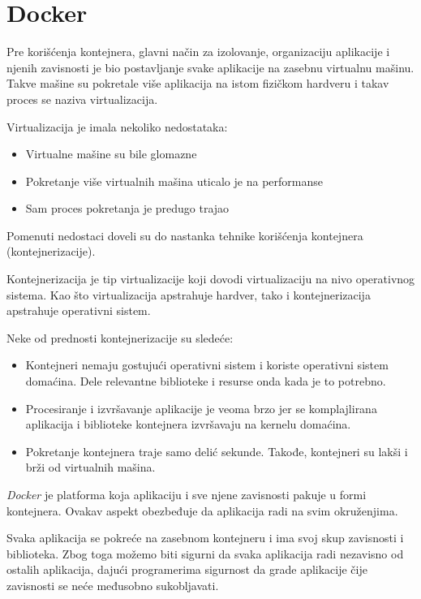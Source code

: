 \section{Docker}\label{sec:docker}

Pre korišćenja kontejnera, glavni način za izolovanje, organizaciju aplikacije i njenih zavisnosti je 
bio postavljanje svake aplikacije na zasebnu virtualnu mašinu. Takve mašine su pokretale više aplikacija 
na istom fizičkom hardveru i takav proces se naziva virtualizacija.

Virtualizacija je imala nekoliko nedostataka: 
\begin{itemize}
    \item Virtualne mašine su bile glomazne
    \item Pokretanje više virtualnih mašina uticalo je na performanse
    \item Sam proces pokretanja je predugo trajao
\end{itemize}

Pomenuti nedostaci doveli su do nastanka tehnike korišćenja kontejnera (kontejnerizacije). 

Kontejnerizacija je tip virtualizacije koji dovodi virtualizaciju na nivo operativnog 
sistema. Kao što virtualizacija apstrahuje hardver, tako i kontejnerizacija apstrahuje 
operativni sistem.

Neke od prednosti kontejnerizacije su sledeće:
\begin{itemize}
    \item Kontejneri nemaju gostujući operativni sistem i koriste operativni sistem domaćina. 
    Dele relevantne biblioteke i resurse onda kada je to potrebno.
    \item Procesiranje i izvršavanje aplikacije je veoma brzo jer se komplajlirana aplikacija 
    i biblioteke kontejnera izvršavaju na kernelu domaćina.
    \item Pokretanje kontejnera traje samo delić sekunde. Takođe, kontejneri su lakši i brži 
    od virtualnih mašina.
\end{itemize}

\textit{Docker} je platforma koja aplikaciju i sve njene zavisnosti pakuje u formi kontejnera. 
Ovakav aspekt obezbeđuje da aplikacija radi na svim okruženjima.

Svaka aplikacija se pokreće na zasebnom kontejneru i ima svoj skup zavisnosti i biblioteka. 
Zbog toga možemo biti sigurni da svaka aplikacija radi nezavisno od ostalih aplikacija, 
dajući programerima sigurnost da grade aplikacije čije zavisnosti se neće međusobno sukobljavati.

